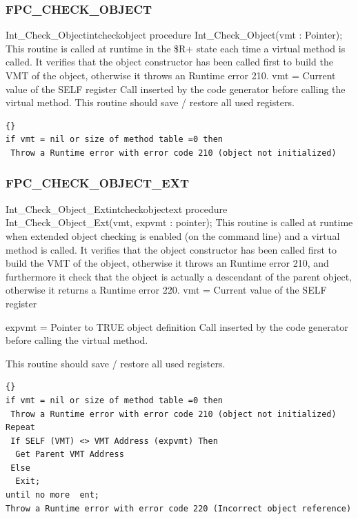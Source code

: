 \documentclass [a4paper,12pt]{article}
\begin{document}
\subsubsection{FPC{\_}CHECK{\_}OBJECT}
\label{subsubsec:mylabel55}

\begin{procedurel}{Int{\_}Check{\_}Object}{intcheckobject}
\Declaration
procedure Int{\_}Check{\_}Object(vmt : Pointer);
\Description
This routine is called at runtime in the {\$}R+ state each time a virtual
method is called. It verifies that the object constructor has been called
first to build the VMT of the object, otherwise it throws an Runtime error 210.
\Parameters
vmt = Current value of the SELF register
\Notes
Call inserted by the code generator before calling the virtual method. This
routine should save / restore all used registers.
\Algorithm
\begin{lstlisting}{}
if vmt = nil or size of method table =0 then
 Throw a Runtime error with error code 210 (object not initialized)
\end{lstlisting}
\end{procedurel}

\subsubsection{FPC{\_}CHECK{\_}OBJECT{\_}EXT}
\label{subsubsec:mylabel56}

\begin{procedurel}{Int{\_}Check{\_}Object{\_}Ext}{intcheckobjectext}
\Declaration
procedure Int{\_}Check{\_}Object{\_}Ext(vmt, expvmt : pointer);
\Description
This routine is called at runtime when extended object checking is enabled (on the command line) and a virtual method is called. It verifies that the object constructor has been called first to build the VMT of the object, otherwise it throws an Runtime error 210, and furthermore it check that the object is actually a descendant of the parent object, otherwise it returns a Runtime error 220.
\Parameters
vmt = Current value of the SELF register \par
expvmt = Pointer to TRUE object definition
\Notes
Call inserted by the code generator before calling the virtual method. \par
This routine should save / restore all used registers.
\Algorithm
\begin{lstlisting}{}
if vmt = nil or size of method table =0 then
 Throw a Runtime error with error code 210 (object not initialized)
Repeat
 If SELF (VMT) <> VMT Address (expvmt) Then
  Get Parent VMT Address
 Else
  Exit; 
until no more  ent; 
Throw a Runtime error with error code 220 (Incorrect object reference)
\end{lstlisting}
\end{procedurel}
\end{document}
